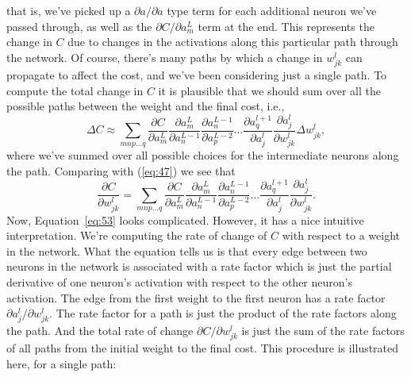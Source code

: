 \documentclass[a4paper,twoside,10pt]{book}
\begin{document}
that is, we've picked up a $\partial{}a/\partial{}a$ type term for each additional neuron we've passed through, as well as the $\partial{}C/\partial{}a^L_m$ term at the end. This represents the change in $C$ due to changes in the activations along this particular path through the network. Of course, there's many paths by which a change in $w^l_{jk}$ can propagate to affect the cost, and we've been considering just a single path. To compute the total change in $C$ it is plausible that we should sum over all the possible paths between the weight and the final cost, i.e.,
\begin{equation}
	\Delta C \approx \sum_{mnp\ldots q} \frac{\partial C}{\partial a^L_m} 
	\frac{\partial a^L_m}{\partial a^{L-1}_n}
	\frac{\partial a^{L-1}_n}{\partial a^{L-2}_p} \ldots
	\frac{\partial a^{l+1}_q}{\partial a^l_j} 
	\frac{\partial a^l_j}{\partial w^l_{jk}} \Delta w^l_{jk},
	\label{eq:52}
\end{equation}
where we've summed over all possible choices for the intermediate neurons along the path. Comparing with (\ref{eq:47}) we see that
\begin{equation}
	\frac{\partial C}{\partial w^l_{jk}} = \sum_{mnp\ldots q} \frac{\partial C}{\partial a^L_m} 
	\frac{\partial a^L_m}{\partial a^{L-1}_n}
	\frac{\partial a^{L-1}_n}{\partial a^{L-2}_p} \ldots
	\frac{\partial a^{l+1}_q}{\partial a^l_j} 
	\frac{\partial a^l_j}{\partial w^l_{jk}}.
	\label{eq:53}
\end{equation}
Now, Equation~\ref{eq:53} looks complicated. However, it has a nice intuitive interpretation. We're computing the rate of change of $C$ with respect to a weight in the network. What the equation tells us is that every edge between two neurons in the network is associated with a rate factor which is just the partial derivative of one neuron's activation with respect to the other neuron's activation. The edge from the first weight to the first neuron has a rate factor $\partial{}a^l_j/\partial{}w^l_{jk}$. The rate factor for a path is just the product of the rate factors along the path. And the total rate of change $\partial{}C/\partial{}w^l_{jk}$ is just the sum of the rate factors of all paths from the initial weight to the final cost. This procedure is illustrated here, for a single path:
\end{document}
